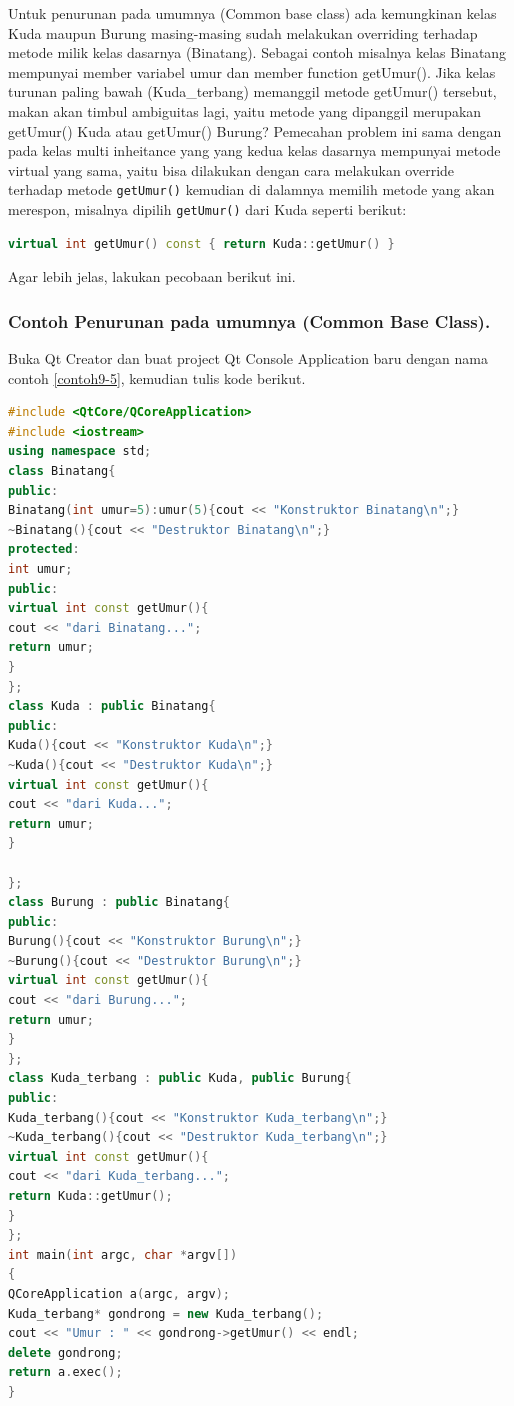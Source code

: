 Untuk penurunan pada umumnya (Common base class) ada kemungkinan kelas
Kuda maupun Burung masing-masing sudah melakukan overriding terhadap
metode milik kelas dasarnya (Binatang). Sebagai contoh misalnya kelas
Binatang mempunyai member variabel umur dan member function getUmur().
Jika kelas turunan paling bawah (Kuda\_terbang) memanggil metode
getUmur() tersebut, makan akan timbul ambiguitas lagi, yaitu metode yang
dipanggil merupakan getUmur() Kuda atau getUmur() Burung? Pemecahan
problem ini sama dengan pada kelas multi inheitance yang yang kedua
kelas dasarnya mempunyai metode virtual yang sama, yaitu bisa dilakukan
dengan cara melakukan override terhadap metode \texttt{getUmur()} kemudian di
dalamnya memilih metode yang akan merespon, misalnya dipilih \texttt{getUmur()}
dari Kuda seperti berikut:

\begin{lstlisting}[language=c++, numbers=none]
virtual int getUmur() const { return Kuda::getUmur() }
\end{lstlisting}

Agar lebih jelas, lakukan pecobaan berikut ini.

\subsubsection*{Contoh  Penurunan pada umumnya (Common Base Class).}

Buka Qt Creator dan buat project Qt Console Application baru dengan nama
contoh \ref{contoh9-5}, kemudian tulis kode berikut.

\begin{lstlisting}[language=c++, caption= Penurunan pada umumnya (Common Base Class), label=contoh9-5]
#include <QtCore/QCoreApplication>
#include <iostream>
using namespace std;
class Binatang{
public:
Binatang(int umur=5):umur(5){cout << "Konstruktor Binatang\n";}
~Binatang(){cout << "Destruktor Binatang\n";}
protected:
int umur;
public:
virtual int const getUmur(){
cout << "dari Binatang...";
return umur;
}
};
class Kuda : public Binatang{
public:
Kuda(){cout << "Konstruktor Kuda\n";}
~Kuda(){cout << "Destruktor Kuda\n";}
virtual int const getUmur(){
cout << "dari Kuda...";
return umur;
}
                                        
};
class Burung : public Binatang{
public:
Burung(){cout << "Konstruktor Burung\n";}
~Burung(){cout << "Destruktor Burung\n";}
virtual int const getUmur(){
cout << "dari Burung...";
return umur;
}
};
class Kuda_terbang : public Kuda, public Burung{
public:
Kuda_terbang(){cout << "Konstruktor Kuda_terbang\n";}
~Kuda_terbang(){cout << "Destruktor Kuda_terbang\n";}
virtual int const getUmur(){
cout << "dari Kuda_terbang...";
return Kuda::getUmur();
}
};
int main(int argc, char *argv[])
{
QCoreApplication a(argc, argv);
Kuda_terbang* gondrong = new Kuda_terbang();
cout << "Umur : " << gondrong->getUmur() << endl;
delete gondrong;
return a.exec();
}
\end{lstlisting}

